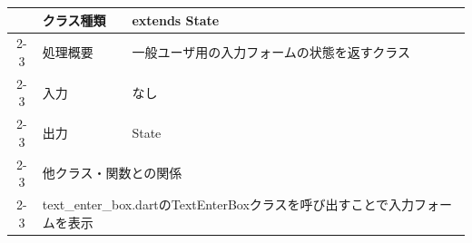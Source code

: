 \begin{table}[H]
\begin{tabular}{|c|l|l|}
                          & クラス種類                                                                             & extends State                                              \\ \cline{2-3}
                          & 処理概要                                                                              & \multicolumn{1}{p{12cm}|}{一般ユーザ用の入力フォームの状態を返すクラス}          \\ \cline{2-3}
                          & 入力                                                                                & なし                                                         \\ \cline{2-3}
                          & 出力                                                                                & State                                                      \\ \cline{2-3}
                          & \multicolumn{2}{l|}{他クラス・関数との関係}                                                                                                               \\ \cline{2-3}
                          & \multicolumn{2}{p{14cm}|}{text\_enter\_box.dartのTextEnterBoxクラスを呼び出すことで入力フォームを表示}                                                              \\ \hline
  \end{tabular}
\end{table}



